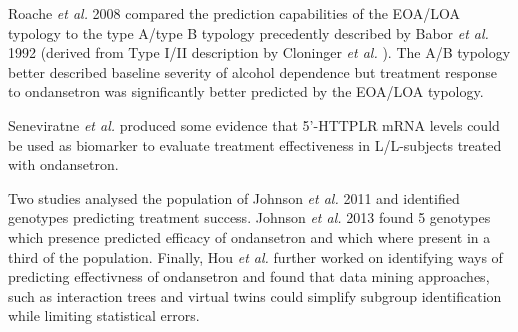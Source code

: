 Roache \textit{et al.} 2008 \cite{roache_prediction_2008} compared the prediction capabilities of the EOA/LOA typology to the type A/type B typology precedently described by Babor \textit{et al.} 1992 \cite{babor1992a}\cite{babor1992b}(derived from Type I/II description by Cloninger \textit{et al.} \cite{cloninger1987systematic}). The A/B typology better described baseline severity of alcohol dependence but treatment response to ondansetron was significantly better predicted by the EOA/LOA typology.

Seneviratne \textit{et al.} \cite{seneviratne_serotonin_2012} produced some evidence that 5'-HTTPLR mRNA levels could be used as biomarker to evaluate treatment effectiveness in L/L-subjects treated with ondansetron.

Two studies analysed the population of Johnson \textit{et al.} 2011 \cite{johnson_pharmacogenetic_2011} and identified genotypes predicting treatment success. Johnson \textit{et al.} 2013 \cite{johnson_determination_2013} found 5 genotypes which presence predicted efficacy of ondansetron and which where present in a third of the population. Finally,  Hou \textit{et al.} \cite{hou_subgroup_2015} further worked on identifying ways of predicting effectivness of ondansetron and found that data mining approaches, such as interaction trees and virtual twins could simplify subgroup identification while limiting statistical errors.
